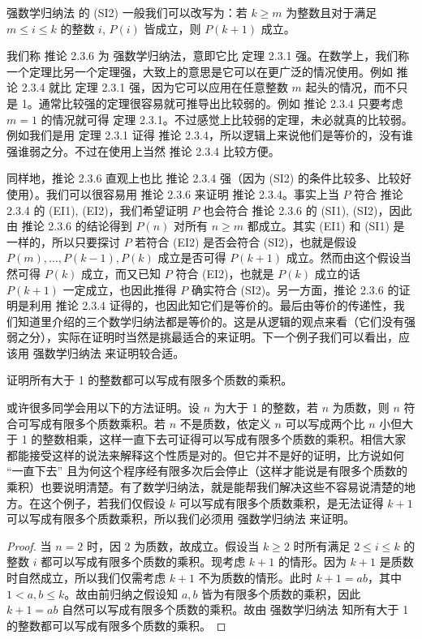 \begin{remark}
强数学归纳法 的 (SI2) 一般我们可以改写为：若 $k \ge m$ 为整数且对于满足 $m \le i \le k$ 的整数 $i$, $P(i)$ 皆成立，则 $P(k+1)$ 成立。
\end{remark}

我们称 推论 2.3.6 为 强数学归纳法，意即它比 定理 2.3.1 强。在数学上，我们称一个定理比另一个定理强，大致上的意思是它可以在更广泛的情况使用。例如 推论 2.3.4 就比 定理 2.3.1 强，因为它可以应用在任意整数 $m$ 起头的情况，而不只是 1。通常比较强的定理很容易就可推导出比较弱的。例如 推论 2.3.4 只要考虑 $m = 1$ 的情况就可得 定理 2.3.1。不过感觉上比较弱的定理，未必就真的比较弱。例如我们是用 定理 2.3.1 证得 推论 2.3.4，所以逻辑上来说他们是等价的，没有谁强谁弱之分。不过在使用上当然 推论 2.3.4 比较方便。

同样地，推论 2.3.6 直观上也比 推论 2.3.4 强（因为 (SI2) 的条件比较多、比较好使用）。我们可以很容易用 推论 2.3.6 来证明 推论 2.3.4。事实上当 $P$ 符合 推论 2.3.4 的 (EI1), (EI2)，我们希望证明 $P$ 也会符合 推论 2.3.6 的 (SI1), (SI2)，因此由 推论 2.3.6 的结论得到 $P(n)$ 对所有 $n \ge m$ 都成立。其实 (EI1) 和 (SI1) 是一样的，所以只要探讨 $P$ 若符合 (EI2) 是否会符合 (SI2)，也就是假设 $P(m), \ldots , P(k - 1), P(k)$ 成立是否可得 $P(k + 1)$ 成立。然而由这个假设当然可得 $P(k)$ 成立，而又已知 $P$ 符合 (EI2)，也就是 $P(k)$ 成立的话 $P(k + 1)$ 一定成立，也因此推得 $P$ 确实符合 (SI2)。另一方面，推论 2.3.6 的证明是利用 推论 2.3.4 证得的，也因此知它们是等价的。最后由等价的传递性，我们知道里介绍的三个数学归纳法都是等价的。这是从逻辑的观点来看（它们没有强弱之分），实际在证明时当然是挑最适合的来证明。下一个例子我们可以看出，应该用 强数学归纳法 来证明较合适。

\begin{example}
证明所有大于 1 的整数都可以写成有限多个质数的乘积。
\end{example}

或许很多同学会用以下的方法证明。设 $n$ 为大于 1 的整数，若 $n$ 为质数，则 $n$ 符合可写成有限多个质数乘积。若 $n$ 不是质数，依定义 $n$ 可以写成两个比 $n$ 小但大于 1 的整数相乘，这样一直下去可证得可以写成有限多个质数的乘积。相信大家都能接受这样的说法来解释这个性质是对的。但它并不是好的证明，比方说如何 “一直下去” 且为何这个程序经有限多次后会停止（这样才能说是有限多个质数的乘积）也要说明清楚。有了数学归纳法，就是能帮我们解决这些不容易说清楚的地方。在这个例子，若我们仅假设 $k$ 可以写成有限多个质数乘积，是无法证得 $k + 1$ 可以写成有限多个质数乘积，所以我们必须用 强数学归纳法 来证明。

\begin{proof}
当 $n = 2$ 时，因 2 为质数，故成立。假设当 $k \ge 2$ 时所有满足 $2 \le i \le k$ 的整数 $i$ 都可以写成有限多个质数的乘积。现考虑 $k + 1$ 的情形。因为 $k + 1$ 是质数时自然成立，所以我们仅需考虑 $k + 1$ 不为质数的情形。此时 $k + 1 = ab$，其中 $1 < a, b \le k$。故由前归纳之假设知 $a, b$ 皆为有限多个质数的乘积，因此 $k + 1 = ab$ 自然可以写成有限多个质数的乘积。故由 强数学归纳法 知所有大于 1 的整数都可以写成有限多个质数的乘积。
\end{proof}

